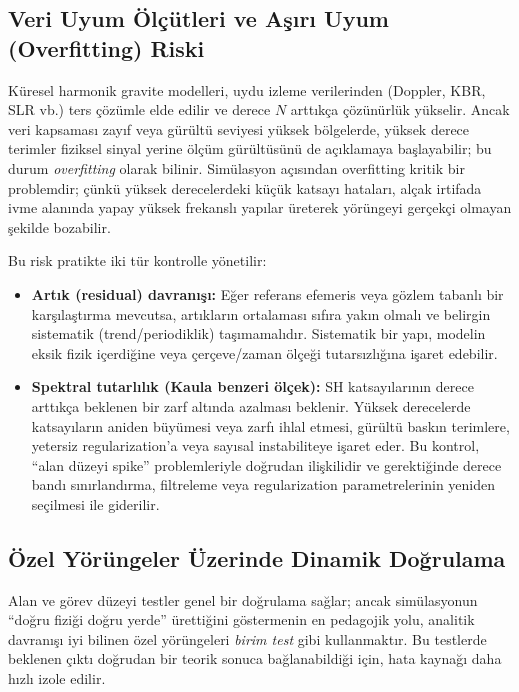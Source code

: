 \subsection{Veri Uyum Ölçütleri ve Aşırı Uyum (Overfitting) Riski}
Küresel harmonik gravite modelleri, uydu izleme verilerinden (Doppler, KBR, SLR vb.) ters çözümle elde edilir ve derece $N$
arttıkça çözünürlük yükselir. Ancak veri kapsaması zayıf veya gürültü seviyesi yüksek bölgelerde, yüksek derece terimler
fiziksel sinyal yerine ölçüm gürültüsünü de açıklamaya başlayabilir; bu durum \textit{overfitting} olarak bilinir.
Simülasyon açısından overfitting kritik bir problemdir; çünkü yüksek derecelerdeki küçük katsayı hataları, alçak irtifada
ivme alanında yapay yüksek frekanslı yapılar üreterek yörüngeyi gerçekçi olmayan şekilde bozabilir.

Bu risk pratikte iki tür kontrolle yönetilir:
\begin{itemize}
\item \textbf{Artık (residual) davranışı:} Eğer referans efemeris veya gözlem tabanlı bir karşılaştırma mevcutsa,
artıkların ortalaması sıfıra yakın olmalı ve belirgin sistematik (trend/periodiklik) taşımamalıdır.
Sistematik bir yapı, modelin eksik fizik içerdiğine veya çerçeve/zaman ölçeği tutarsızlığına işaret edebilir.
\item \textbf{Spektral tutarlılık (Kaula benzeri ölçek):} SH katsayılarının derece arttıkça beklenen bir zarf altında
azalması beklenir. Yüksek derecelerde katsayıların aniden büyümesi veya zarfı ihlal etmesi, gürültü baskın terimlere,
yetersiz regularization'a veya sayısal instabiliteye işaret eder. Bu kontrol, ``alan düzeyi spike'' problemleriyle doğrudan
ilişkilidir ve gerektiğinde derece bandı sınırlandırma, filtreleme veya regularization parametrelerinin yeniden seçilmesi
ile giderilir.
\end{itemize}

\subsection{Özel Yörüngeler Üzerinde Dinamik Doğrulama}
Alan ve görev düzeyi testler genel bir doğrulama sağlar; ancak simülasyonun ``doğru fiziği doğru yerde'' ürettiğini
göstermenin en pedagojik yolu, analitik davranışı iyi bilinen özel yörüngeleri \emph{birim test} gibi kullanmaktır.
Bu testlerde beklenen çıktı doğrudan bir teorik sonuca bağlanabildiği için, hata kaynağı daha hızlı izole edilir.

